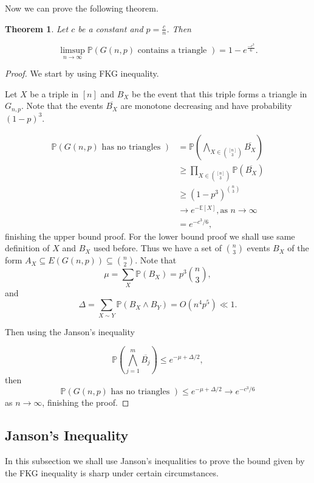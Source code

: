 \documentclass[12pt,twoside,a4paper,bibliography=totocnumbered]{book}
\numberwithin{equation}{section}
\newtheorem{theorem}             {Theorem}[section]
\theoremstyle{remark}
\begin{document}
Now we can prove the following theorem.

\begin{theorem} \label{theo:FKG}
Let $c$ be a constant and $p = \frac{c}{n}$. Then

$$ \limsup_{n \rightarrow \infty}\mathbb{P}(G(n,p)\text{ contains a triangle }) = 1 - e^{\frac{-c^3}{6}}.$$
\end{theorem}
\begin{proof}

We start by using FKG inequality.

Let $X$ be a triple in $[n]$ and $B_X$ be the event that this triple forms a triangle in $G_{n,p}$. Note that the events $\overline{B_X}$ are monotone decreasing and have probability $(1-p)^3$.

\begin{align*}
\mathbb{P}(G(n,p) \text{ has no triangles }) &= \mathbb{P}\left( \bigwedge_{X \in \binom{[n]}{3}} \overline{B_X}\right) \\
& \geq \prod_{X \in \binom{[n]}{3}} \mathbb{P}(\overline{B_X})\\
& \geq (1-p^3)^{\binom{n}{3}}\\
& \rightarrow e^{-\mathbb{E}[X]}, \text{as $n \rightarrow \infty$}\\
& = e^{-c^3/6},
\end{align*}
finishing the upper bound proof. For the lower bound proof we shall use same definition of $X$ and $B_X$ used before. Thus we have a set of $\binom{n}{3}$ events $B_X$ of the form $A_X \subseteq E(G(n,p)) \subseteq \binom{n}{2}$.
Note that 
$$\mu = \sum_X \mathbb{P} (B_X) = p^3\binom {n}{3},$$
and
$$\Delta = \sum_{X\sim Y} \mathbb{P}(B_X \wedge B_Y) = O(n^4 p^5) \ll 1.$$

Then using the Janson's inequality 

$$ \mathbb{P}\left(\bigwedge_{j=1}^m \overline{B_j}\right) \leq e^{-\mu + \Delta/2}, $$
then
$$ \mathbb{P}(G(n,p)\text{ has no triangles }) \leq e^{-\mu + \Delta/2} \rightarrow e^{-c^3/6}$$
as $n \rightarrow \infty$, finishing the proof.
\end{proof}

\subsection{Janson's Inequality}

In this subsection we shall use Janson's inequalities to prove the bound given by the FKG inequality is sharp under certain circumstances.
\end{document}
